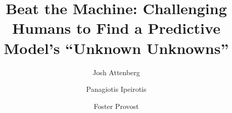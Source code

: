 \documentclass[smallcondensed]{svjour3}
\begin{document}
 
\title{Beat the Machine: Challenging Humans to Find a Predictive Model's ``Unknown Unknowns''}


\author{Josh Attenberg         \and   Panagiotis Ipeirotis \and Foster Provost
}


%
%
%





\maketitle
\end{document}
